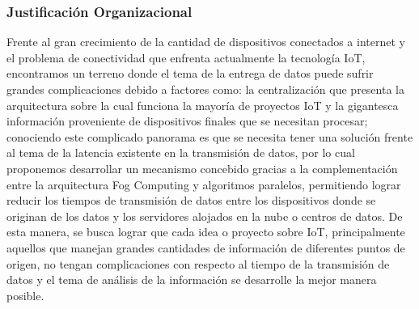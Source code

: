         \subsubsection{Justificación Organizacional}
            Frente al gran crecimiento de la cantidad de dispositivos conectados a internet y el problema de conectividad que enfrenta actualmente la tecnología IoT, encontramos un terreno donde el tema de la entrega de datos puede sufrir grandes complicaciones debido a factores como: la centralización que presenta la arquitectura sobre la cual funciona la mayoría de proyectos IoT y la gigantesca información proveniente de dispositivos finales que se necesitan procesar; conociendo este complicado panorama es que se necesita tener una solución frente al tema de la latencia existente en la transmisión de datos, por lo cual proponemos desarrollar un mecanismo concebido gracias a la complementación entre la arquitectura Fog Computing y algoritmos paralelos, permitiendo lograr reducir los tiempos de transmisión de datos entre los dispositivos donde se originan de los datos y los servidores alojados en la nube o centros de datos. De esta manera, se busca lograr que cada idea o proyecto sobre IoT, principalmente aquellos que manejan grandes cantidades de información de diferentes puntos de origen, no tengan complicaciones con respecto al tiempo de la transmisión de datos y el tema de análisis de la información se desarrolle la mejor manera posible.
